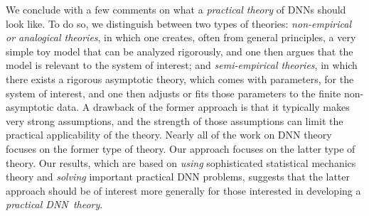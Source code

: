 We conclude with a few comments on what a \emph{practical theory} of DNNs should look like.
To do so, we distinguish between two types of theories:
\emph{non-empirical or analogical theories}, in which one creates, often from general principles, a very simple toy model that can be analyzed rigorously, and one then argues that the model is relevant to the system of interest; and 
\emph{semi-empirical theories}, in which there exists a rigorous asymptotic theory, which comes with parameters, for the system of interest, and one then adjusts or fits those parameters to the finite non-asymptotic data.
A drawback of the former approach is that it typically makes very strong assumptions, and the strength of those assumptions can limit the practical applicability of the theory.
Nearly all of the work on DNN theory focuses on the former type of theory.
Our approach focuses on the latter type of theory.
Our results, which are based on \emph{using} sophisticated statistical mechanics theory and \emph{solving} important practical DNN problems, suggests that the latter approach should be of interest more generally for those interested in developing a \emph{practical DNN~theory}.


